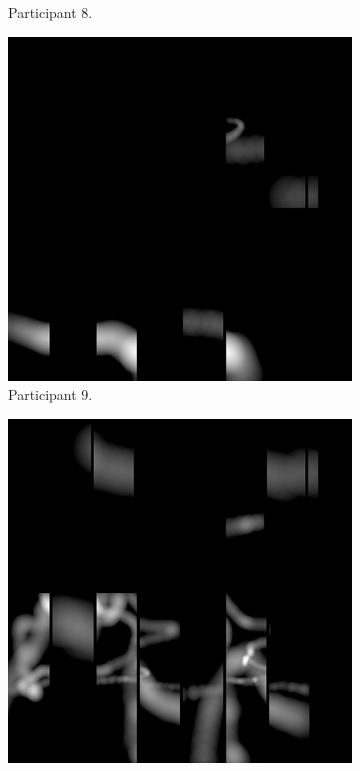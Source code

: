 \begin{figure}[!ht]
\begin{subfigure}[b]{0.24\textwidth}
        \caption{Participant 8.}
    \end{subfigure}
    \hfill    
    \begin{subfigure}[b]{0.24\textwidth}
        \centering
        \includegraphics[width=\textwidth]{img/data/Panel2/single/9.png}
        \caption{Participant 9.}
    \end{subfigure}
    \hfill    
    \begin{subfigure}[b]{0.24\textwidth}
        \centering
        \includegraphics[width=\textwidth]{img/data/Panel2/single/10.png}

\end{subfigure}
\end{figure}

